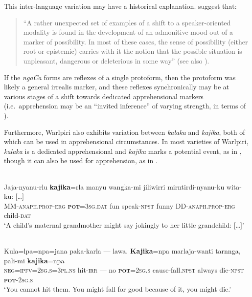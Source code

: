 \documentclass[output=paper,colorlinks,citecolor=brown]{langscibook}
\begin{document}
 This inter-language variation may have a historical explanation. \citet[211]{bybee_evolution_1994} suggest that:
\begin{quote}
    ``A rather unexpected set of examples of a shift to a speaker-oriented modality is found in the development of an admonitive mood out of a marker of possibility. In most of these cases, the sense of possibility (either root or epistemic) carries with it the notion that the possible situation is unpleasant, dangerous or deleterious in some way'' (see also \cite{pakendorf_possibility_2007}).
\end{quote}

\noindent If the \textit{ngaCa} forms are reflexes of a single protoform, then the protoform was likely a general irrealis marker, and these reflexes synchronically may be at various stages of a shift towards dedicated apprehensional markers (i.e.\  apprehension may be an ``invited inference'' of varying strength, in terms of \cite[34--40]{traugott_regularity_2004}).

Furthermore, Warlpiri also exhibits variation between \textit{kalaka} and \textit{kajika}, both of which can be used in apprehensional circumstances. In  most varieties of Warlpiri, \textit{kalaka} is a dedicated apprehensional and \textit{kajika} marks a potential event, as in , though it can also be used for apprehension, as in . 


\ea 
{} \\
\gll Jaja-nyanu-rlu \textbf{kajika}=rla manyu wangka-mi jiliwirri  mirntirdi-nyanu-ku wita-ku: $[$\ldots$]$ \\
MM-\textsc{anaph.prop-erg} \textsc{\textbf{pot}=3sg.dat} fun speak-\textsc{npst} funny DD-\textsc{anaph.prop-erg} child-\textsc{dat} \\
\glt `A child's maternal grandmother might say jokingly to her little grandchild: $[$\ldots$]$'
\label{ex:bro69}
\z

\ea 
{} \\
\gll Kula=lpa=npa=jana paka-karla --- lawa. \textbf{Kajika}=npa marlaja-wanti tarnnga, pali-mi \textbf{kajika}=npa \\
\textsc{neg=ipfv=2sg.s=3pl.ns} hit-\textsc{irr} --- no \textsc{\textbf{pot}=2sg.s} cause-fall.\textsc{npst} always die-\textsc{npst} \textsc{\textbf{pot}-2sg.s} \\
\glt `You cannot hit them. You might fall for good because of it, you might die.'
\label{ex:bro70}
\z
\end{document}
